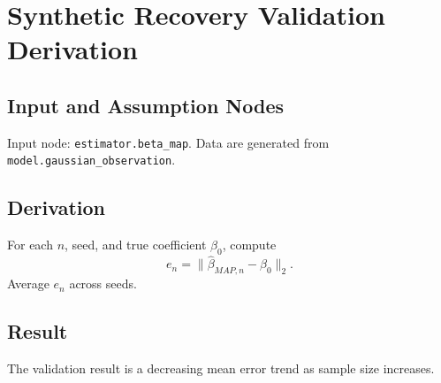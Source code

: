 \section{Synthetic Recovery Validation Derivation}
\label{validation:synthetic-recovery}

\subsection{Input and Assumption Nodes}
Input node: \texttt{estimator.beta\_map}. Data are generated from \texttt{model.gaussian\_observation}.

\subsection{Derivation}
For each \(n\), seed, and true coefficient \(\beta_0\), compute
\[
  e_n = \|\hat{\beta}_{MAP,n}-\beta_0\|_2.
\]
Average \(e_n\) across seeds.

\subsection{Result}
The validation result is a decreasing mean error trend as sample size increases.

